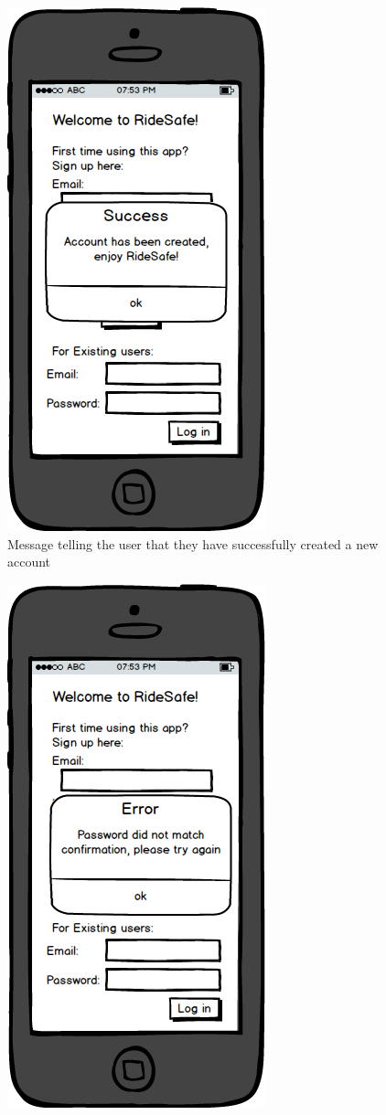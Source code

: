 \documentclass[a4paper]{report}
\begin{document}
{\begin{figure}
\includegraphics[scale=0.9]{figures/prototype_2/create_success}
\caption{Message telling the user that they have successfully created a new account}
\end{figure}
\clearpage
\begin{figure}
\centering
\includegraphics[scale=0.9]{figures/prototype_2/pass_conf_err}

\end{figure}}
\end{document}
